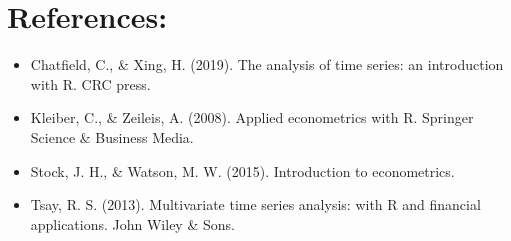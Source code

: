 \documentclass[]{book}
\begin{document}
\hypertarget{references-3}{%
\section{References:}\label{references-3}}

\begin{itemize}
\item
  Chatfield, C., \& Xing, H. (2019). The analysis of time series: an introduction with R. CRC press.
\item
  Kleiber, C., \& Zeileis, A. (2008). Applied econometrics with R. Springer Science \& Business Media.
\item
  Stock, J. H., \& Watson, M. W. (2015). Introduction to econometrics.
\item
  Tsay, R. S. (2013). Multivariate time series analysis: with R and financial applications. John Wiley \& Sons.
\end{itemize}


\end{document}
